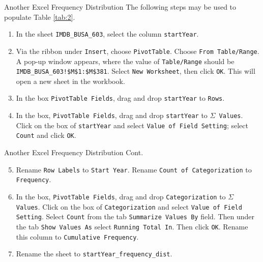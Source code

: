 \documentclass[pdf]{beamer}
\theoremstyle{remark}
\theoremstyle{definition}
\begin{document}
\begin{frame}[t]{Another Excel Frequency Distribution}
The following steps may be used to populate Table \ref{tab:2}.\\  
\vspace{1.5ex}
\begin{enumerate}
\item In the sheet \texttt{IMDB\_BUSA\_603}, select the column \texttt{startYear}.
\item Via the ribbon under \texttt{Insert}, choose \texttt{PivotTable}.  Choose \texttt{From Table/Range}.  A pop-up window appears, where the value of \texttt{Table/Range} should be \texttt{IMDB\_BUSA\_603!\$M\$1:\$M\$381}.  Select \texttt{New Worksheet}, then click \texttt{OK}.  This will open a new sheet in the workbook.
\item In the box \texttt{PivotTable Fields}, drag and drop \texttt{startYear} to \texttt{Rows}.
\item In the box, \texttt{PivotTable Fields}, drag and drop \texttt{startYear} to \texttt{$\Sigma$ Values}.  Click on the box of \texttt{startYear} and select \texttt{Value of Field Setting};  select \texttt{Count} and click \texttt{OK}.
\end{enumerate}
\end{frame}

\begin{frame}[t]{Another Excel Frequency Distribution Cont.}
\begin{enumerate}
\setcounter{enumi}{4}
\item Rename \texttt{Row Labels} to \texttt{Start Year}. Rename \texttt{Count of Categorization} to \texttt{Frequency}.
\item In the box, \texttt{PivotTable Fields}, drag and drop \texttt{Categorization} to \texttt{$\Sigma$ Values}.  Click on the box of \texttt{Categorization} and select \texttt{Value of Field Setting}.  Select \texttt{Count} from the tab \texttt{Summarize Values By} field.  Then under the tab \texttt{Show Values As} select \texttt{Running Total In}.  Then click \texttt{OK}.  Rename this column to \texttt{Cumulative Frequency}.
\item Rename the sheet to \texttt{startYear\_frequency\_dist}.
\end{enumerate}
\normalsize
\end{frame}
\end{document}
